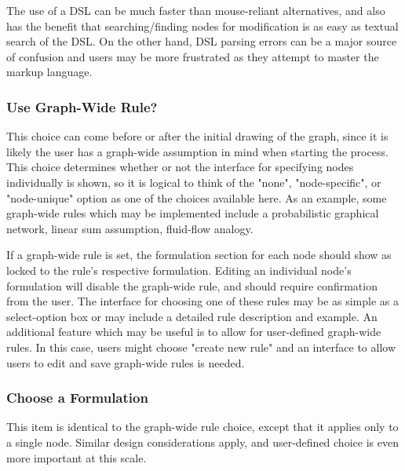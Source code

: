 \documentclass[runningheads,a4paper]{llncs}
\begin{document}
The use of a DSL can be much faster than mouse-reliant alternatives, and also has the benefit that searching/finding nodes for modification is as easy as textual search of the DSL.
On the other hand, DSL parsing errors can be a major source of confusion and users may be more frustrated as they attempt to master the markup language.


\subsubsection{Use Graph-Wide Rule?}
This choice can come before or after the initial drawing of the graph, since it is likely the user has a graph-wide assumption in mind when starting the process. 
This choice determines whether or not the interface for specifying nodes individually is shown, so it is logical to think of the "none", "node-specific", or "node-unique" option as one of the choices available here. 
As an example, some graph-wide rules which may be implemented include a probabilistic graphical network, linear sum assumption, fluid-flow analogy.

If a graph-wide rule is set, the formulation section for each node should show as locked to the rule's respective formulation. 
Editing an individual node's formulation will disable the graph-wide rule, and should require confirmation from the user. 
The interface for choosing one of these rules may be as simple as a select-option box or may include a detailed rule description and example. 
An additional feature which may be useful is to allow for user-defined graph-wide rules. 
In this case, users might choose "create new rule" and an interface to allow users to edit and save graph-wide rules is needed.

% 

\subsubsection{Choose a Formulation}
This item is identical to the graph-wide rule choice, except that it applies only to a single node. Similar design considerations apply, and user-defined choice is even more important at this scale.
\end{document}

